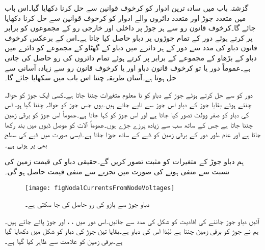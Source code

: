 گزشتہ باب میں سادہ ترین ادوار کو کرخوف قوانین سے حل کرنا دکھایا گیا۔اس باب میں متعدد جوڑ اور متعدد دائروں والے ادوار کو کرخوف قوانین سے حل کرنا دکھایا جائے گا۔کرخوف قانون رو سے ہر جوڑ پر داخلی اور خارجی رو کے مجموعوں کو برابر پر کرتے ہوئے دور کے تمام جوڑوں پر دباو حاصل کیا جاتا ہے۔اس کے برعکس کرخوف قانون دباو کی مدد سے دور کے ہر دائرے میں دباو کے گھٹاو کے مجموعے کو دائرے میں دباو کے  بڑھاو کے مجموعے کے برابر پر کرتے ہوئے تمام دائروں کی رو حاصل کی جاتی ہے۔عموماً  دور یا تو کرخوف قانون دباو اور یا کرخوف قانون رو سے زیادہ آسانی سے حل ہوتا ہے۔آسان طریقہ چننا اس باب میں سکھایا جائے گا۔

دور کو  سے حل کرتے ہوئے  جوڑ کے دباو کو  نا معلوم متغیرات چننا جاتا ہے۔کسی ایک جوڑ کو حوالہ چنتے ہوئے بقایا جوڑ کے دباو اس جوڑ سے ناپے جاتے ہیں۔یوں جس جوڑ کو حوالہ چننا گیا ہو، اس کی دباو کو صفر وولٹ تصور کیا جاتا ہے اور اس جوڑ کو   کہا جاتا ہے۔عموماً اس جوڑ کو برقی زمین چننا جاتا ہے جس کے ساتھ سب سے زیادہ پرزے جڑے ہوں۔عموماً آلات کو موصل ڈبوں میں بند رکھا جاتا ہے اور عام طور دور کے برقی زمین کو ڈبے کے ساتھ جوڑا جاتا ہے۔ایسی صورت میں ڈبے کی سطح  بھی  پر ہوتی ہے۔

ہم دباو جوڑ کے متغیرات کو مثبت تصور کریں گے۔حقیقی دباو کی قیمت زمین کی نسبت سے منفی ہونے کی صورت میں تجزیے سے منفی قیمت حاصل ہو گی۔ 

\begin{figure}
\centering
\texttt{[image: figNodalCurrentsFromNodeVoltages]}
\caption{دباو جوڑ سے بازو کی رو حاصل کی جا سکتی ہے۔}
\label{شکل_جوڑ_دباو__جوڑ_سے_رو_کا_حصول}
\end{figure}

آئیں دباو جوڑ جاننے کی افادیت کو  شکل  کی مدد سے جانیں۔اس دور میں ، ،  اور  جوڑ پائے جاتے ہیں۔ہم نے جوڑ  کو برقی زمین چننا ہے لہٰذا اس کی دباو  ہے۔بقایا تین جوڑ کی دباو کو شکل میں دکھایا گیا ہے۔برقی زمین کو علامت سے ظاہر کیا گیا ہے۔

